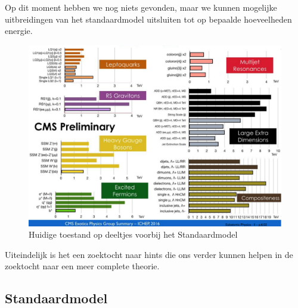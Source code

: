 \documentclass[../main.tex]{subfiles}
\begin{document}
Op dit moment hebben we nog niets gevonden, maar we kunnen mogelijke uitbreidingen van het standaardmodel uitsluiten tot op bepaalde hoeveelheden energie.

\begin{figure}[h]
    \centering
    \includegraphics[width=0.6\linewidth]{physics_beyond_the_standard_model/current_state.png}
    \caption{Huidige toestand op deeltjes voorbij het Standaardmodel}%
    \label{fig:physics_beyond_the_standard_model/current_state}
\end{figure}

Uiteindelijk is het een zoektocht naar hints die ons verder kunnen helpen in de zoektocht naar een meer complete theorie.

\subsection{Standaardmodel}%
\label{sub:standaard_model}
\end{document}

